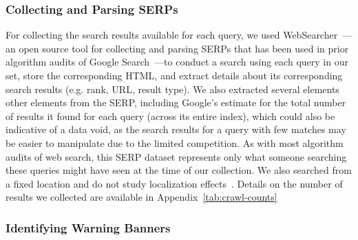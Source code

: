 \subsubsection{Collecting and Parsing SERPs}
\label{sec:methods-serps-collecting}

For collecting the search results available for each query, we used WebSearcher~\citep{robertson2020websearcher}---an open source tool for collecting and parsing SERPs that has been used in prior algorithm audits of Google Search~\citep{mejova2022googling}---to conduct a search using each query in our set, store the corresponding HTML, and extract details about its corresponding search results (e.g. rank, URL, result type). 
We also extracted several elements other elements from the SERP, including Google's estimate for the total number of results it found for each query (across its entire index), which could also be indicative of a data void, as the search results for a query with few matches may be easier to manipulate due to the limited competition.
As with most algorithm audits of web search, this SERP dataset represents only what someone searching these queries might have seen at the time of our collection. 
We also searched from a fixed location and do not study localization effects~\citep{kliman-silver2015location}.
Details on the number of results we collected are available in Appendix~\ref{tab:crawl-counts}

\subsubsection{Identifying Warning Banners}
\label{sec:methods-serps-banners}

